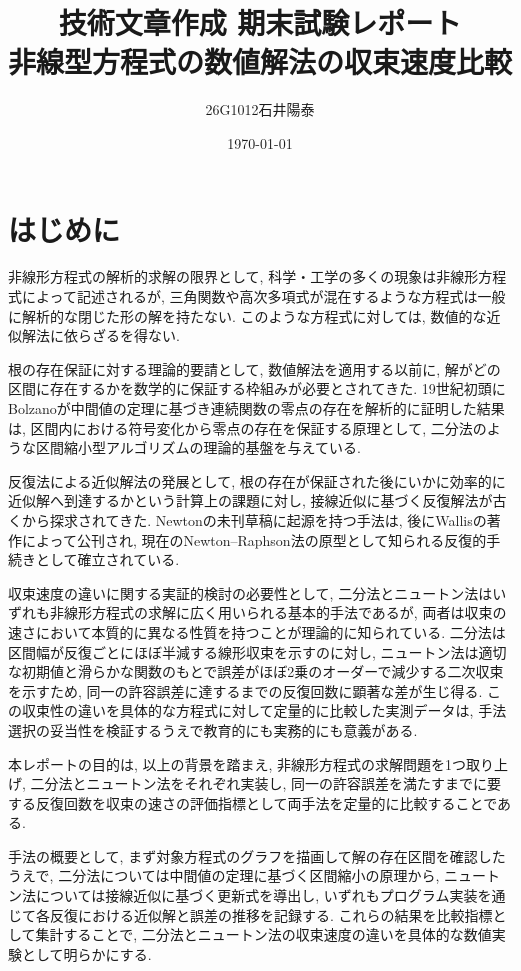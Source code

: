 \documentclass[a4paper,fontsize=11pt,line_length=40zw,number_of_lines=35,baselineskip=1.7zw]{jlreq}
\title{技術文章作成 期末試験レポート \\
  \large 非線型方程式の数値解法の収束速度比較}
\author{26G1012\quad 石井陽泰}
\date{\today}
\begin{document}
\maketitle

\section{はじめに}

非線形方程式の解析的求解の限界として, 科学・工学の多くの現象は非線形方程式によって記述されるが, 三角関数や高次多項式が混在するような方程式は一般に解析的な閉じた形の解を持たない.
このような方程式に対しては, 数値的な近似解法に依らざるを得ない.\cite{narayanan2026ComparativeStudyNumerical}

根の存在保証に対する理論的要請として, 数値解法を適用する以前に, 解がどの区間に存在するかを数学的に保証する枠組みが必要とされてきた.
19世紀初頭にBolzanoが中間値の定理に基づき連続関数の零点の存在を解析的に証明した結果は, 区間内における符号変化から零点の存在を保証する原理として, 二分法のような区間縮小型アルゴリズムの理論的基盤を与えている.\cite{bernardReinAnalytischerBeweis1817}

反復法による近似解法の発展として, 根の存在が保証された後にいかに効率的に近似解へ到達するかという計算上の課題に対し, 接線近似に基づく反復解法が古くから探求されてきた.
Newtonの未刊草稿に起源を持つ手法は, 後にWallisの著作によって公刊され, 現在のNewton--Raphson法の原型として知られる反復的手続きとして確立されている.\cite{newtonAnalysiAequationesNumero1669,wallisTreatiseAlgebra1685}

収束速度の違いに関する実証的検討の必要性として, 二分法とニュートン法はいずれも非線形方程式の求解に広く用いられる基本的手法であるが, 両者は収束の速さにおいて本質的に異なる性質を持つことが理論的に知られている.
二分法は区間幅が反復ごとにほぼ半減する線形収束を示すのに対し, ニュートン法は適切な初期値と滑らかな関数のもとで誤差がほぼ2乗のオーダーで減少する二次収束を示すため, 同一の許容誤差に達するまでの反復回数に顕著な差が生じ得る.\cite{shaimbetova2025NumericalComparisonBisection}
この収束性の違いを具体的な方程式に対して定量的に比較した実測データは, 手法選択の妥当性を検証するうえで教育的にも実務的にも意義がある.

本レポートの目的は, 以上の背景を踏まえ, 非線形方程式の求解問題を1つ取り上げ, 二分法とニュートン法をそれぞれ実装し, 同一の許容誤差を満たすまでに要する反復回数を収束の速さの評価指標として両手法を定量的に比較することである.

手法の概要として, まず対象方程式のグラフを描画して解の存在区間を確認したうえで, 二分法については中間値の定理に基づく区間縮小の原理から, ニュートン法については接線近似に基づく更新式を導出し, いずれもプログラム実装を通じて各反復における近似解と誤差の推移を記録する.
これらの結果を比較指標として集計することで, 二分法とニュートン法の収束速度の違いを具体的な数値実験として明らかにする.
\end{document}
